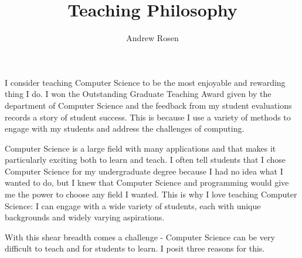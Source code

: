 \documentclass[a4paper]{article}
\author{Andrew Rosen}
\title{Teaching Philosophy}
\date{}
\begin{document}
\maketitle
%
%
%

I consider teaching Computer Science to be the most enjoyable and rewarding thing I do.
I won the Outstanding Graduate Teaching Award given by the department of Computer Science and the feedback from my  student evaluations records a story of student success. 
This is because I use a variety of methods to engage with my students and address the challenges of computing.



% 


Computer Science is a large field with many applications and that makes it particularly exciting both to learn and teach.
I often tell students that I chose Computer Science for my undergraduate degree because I had no idea what I wanted to do, but I knew that Computer Science and programming would give me the power to choose any field I wanted.
This is why I love teaching Computer Science:  I can engage with a wide variety of students, each with unique backgrounds and widely varying aspirations.

With this shear breadth comes a challenge - Computer Science can be very difficult to teach and for students to learn.
I posit three reasons for this.
\end{document}
